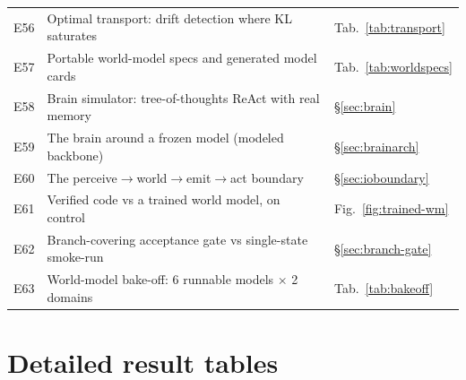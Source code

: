 \documentclass[11pt]{article}
\begin{document}
\begin{longtable}{@{}r p{} l@{}}
E56 & Optimal transport: drift detection where KL saturates & Tab.~\ref{tab:transport} \\
E57 & Portable world-model specs and generated model cards & Tab.~\ref{tab:worldspecs} \\
E58 & Brain simulator: tree-of-thoughts ReAct with real memory & \S\ref{sec:brain} \\
E59 & The brain around a frozen model (modeled backbone) & \S\ref{sec:brainarch} \\
E60 & The perceive$\to$world$\to$emit$\to$act boundary & \S\ref{sec:ioboundary} \\
E61 & Verified code vs a trained world model, on control & Fig.~\ref{fig:trained-wm} \\
E62 & Branch-covering acceptance gate vs single-state smoke-run & \S\ref{sec:branch-gate} \\
E63 & World-model bake-off: 6 runnable models $\times$ 2 domains & Tab.~\ref{tab:bakeoff} \\
\end{longtable}
\endgroup



\section{Detailed result tables}\label{app:tables}

\begin{table}[htb]\centering\small

\caption{E2 + E16: synthesis reliability by generator scale and family.
Qwen rows: five compilation attempts per world; Llama/Gemma rows: three per
world. Maximum four verify--repair iterations each; wall-clock includes all
iterations.}
\label{tab:synthesis-app}
\end{table}

\begin{table}[htb]\centering\small

\caption{E18: filter-vs-repair decomposition of the full verification gate
(3B generator, eight paired high-temperature attempts per regime).}
\label{tab:repair-app}
\end{table}

\begin{table}[htb]\centering\small

\caption{E19: exact transition accuracy on the branch-covering probe suite
across a 1$\times$/10$\times$/100$\times$ scale ladder.}
\label{tab:ladder-app}
\end{table}

\begin{table}[htb]\centering\small

\caption{E9: tuning-strategy comparison on the triage auto-configuration
problem; ten seeds per strategy, \TuningBudget-trial budget.}
\label{tab:tuning-app}
\end{table}
\end{document}
